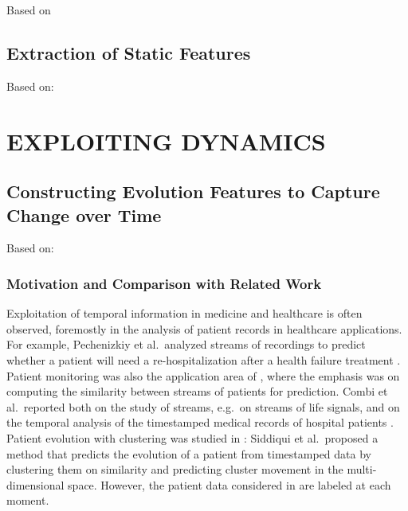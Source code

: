 \documentclass[
]{book}
\begin{document}
Based on \autocite{Niemann:Pheno2020,Niemann:SREP2020,Niemann:PONE2020,Niemann:Frontiers2020}

\hypertarget{extraction-of-static-features}{%
\chapter{Extraction of Static Features}\label{extraction-of-static-features}}

Based on: \autocite{Niemann:CBMS2018}

\hypertarget{part-exploiting-dynamics}{%
\part{EXPLOITING DYNAMICS}\label{part-exploiting-dynamics}}

\hypertarget{evo}{%
\chapter{Constructing Evolution Features to Capture Change over Time}\label{evo}}

Based on: \autocite{Niemann:CBMS2015}

\hypertarget{motivation-and-comparison-with-related-work-2}{%
\section{Motivation and Comparison with Related Work}\label{motivation-and-comparison-with-related-work-2}}

Exploitation of temporal information in medicine and healthcare is often observed, foremostly in the analysis of patient records in healthcare applications. For example, Pechenizkiy et al.~analyzed streams of recordings to predict whether a patient will need a re-hospitalization after a health failure treatment \autocite{PechenizkiyEtAl:CBMS10}. Patient monitoring was also the application area of \autocite{SunEtAl:ICDM10}, where the emphasis was on computing the similarity between streams of patients for prediction. Combi et al.~reported both on the study of streams, e.g.~on streams of life signals, and on the temporal analysis of the timestamped medical records of hospital patients \autocite{CombiEtAl:2010}.
Patient evolution with clustering was studied in \autocite{SiddiquiEtAl:BIH14}: Siddiqui et al.~proposed a method that predicts the evolution of a patient from timestamped data by clustering them on similarity and predicting cluster movement in the multi-dimensional space. However, the patient data considered in \autocite{SiddiquiEtAl:BIH14} are labeled at each moment.
\end{document}
